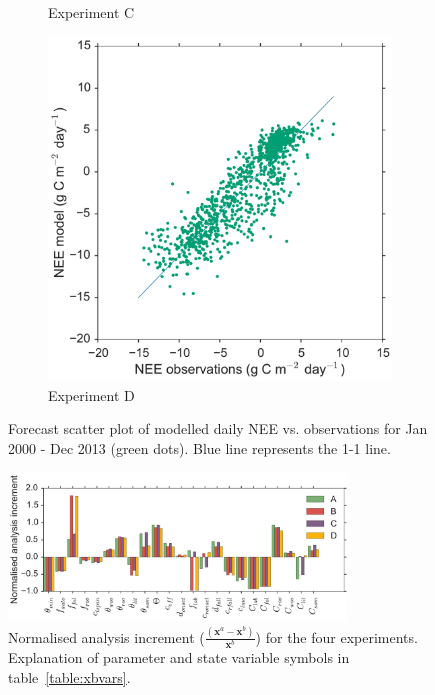 \documentclass[review]{elsarticle}
\begin{document}
\begin{figure}
\begin{subfigure}[b]{0.4\textwidth}
        \caption{Experiment C}
        \label{fig:forecastscatBcorR}
    \end{subfigure}
    \begin{subfigure}[b]{0.4\textwidth}
        \includegraphics[width=\textwidth]{Dfscat2.pdf}
        \caption{Experiment D}
        \label{fig:forecastscatedcBcorR}
    \end{subfigure}
    \caption{Forecast scatter plot of modelled daily NEE vs. observations for Jan 2000 - Dec 2013 (green dots). Blue line represents the 1-1 line.}\label{fig:animals}
\end{figure}

\begin{figure}[ht]
    \centering
    \includegraphics[width=0.8\textwidth]{inccvt2.pdf}
    \caption{Normalised analysis increment \big($\frac{(\textbf{x}^a - \textbf{x}^b)}{\textbf{x}^b}$\big) for the four experiments. Explanation of parameter and state variable symbols in table~\ref{table:xbvars}.}
    \label{fig:xa_inc}
\end{figure}
\end{document}
